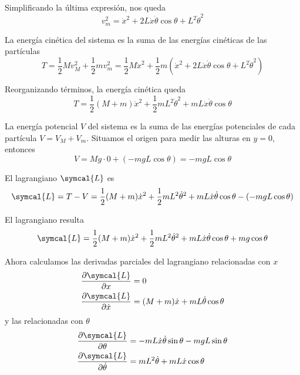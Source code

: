 Simplificando la última expresión, nos queda
\begin{equation}
  v_m^2 = \dot{x}^2 + 2L\dot{x}\dot{\theta}\cos\theta + L^2\dot{\theta}^2
\end{equation}


La energía cinética del sistema es la suma de las energías cinéticas de las partículas
\[
  T = \frac{1}{2} M v_M^2 + \frac{1}{2} m v_m^2
  = \dfrac{1}{2}M\dot{x}^2
  + \dfrac{1}{2}m
  \left(\dot{x}^2 + 2L\dot{x}\dot{\theta}\cos\theta + L^2\dot{\theta}^2
  \right)
\]

Reorganizando términos, la energía cinética queda
\begin{equation}
  T = \dfrac{1}{2}(M+m)\dot{x}^2 + \dfrac{1}{2}mL^2\dot{\theta}^2 + mL\dot{x}\dot{\theta}\cos\theta
\end{equation}

La energía potencial $V$ del sistema es la suma de las energías potenciales de cada partícula
$V = V_M + V_m$. Situamos el origen para medir las alturas en $y=0$, entonces
\begin{equation}
  V = Mg\cdot 0 + (-mgL\cos\theta) = -mgL\cos\theta
\end{equation}

El lagrangiano $\symcal{L}$ es
\[
  \symcal{L} = T - V
  = \dfrac{1}{2}(M+m)\dot{x}^2 + \dfrac{1}{2}mL^2\dot{\theta}^2 + mL\dot{x}\dot{\theta}\cos\theta
  - (-mgL\cos\theta)
\]

El lagrangiano resulta
\begin{equation}
  \symcal{L}
  = \dfrac{1}{2}(M+m)\dot{x}^2 + \dfrac{1}{2}mL^2\dot{\theta}^2 + mL\dot{x}\dot{\theta}\cos\theta
  + mg\cos\theta
\end{equation}

Ahora calculamos las derivadas parciales del lagrangiano relacionadas con $x$
\begin{align}
  \frac{\partial\symcal{L}}{\partial x} &= 0\\
  \frac{\partial\symcal{L}}{\partial\dot{x}} &= (M+m)\dot{x} + mL\dot{\theta}\cos\theta
\end{align}
y las relacionadas con $\theta$
\begin{align}
  \frac{\partial\symcal{L}}{\partial\theta} &= -mL\dot{x}\dot{\theta}\sin\theta-mgL\sin\theta\\
  \frac{\partial\symcal{L}}{\partial\dot{\theta}} &= mL^2\dot{\theta} + mL\dot{x}\cos\theta
\end{align}


